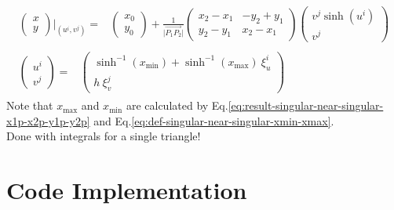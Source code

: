 \documentclass [10pt,letterpaper]{article}
\begin{document}
\begin{subequations} \label{eq:singular-near-singular-x-y-ui-vj}
	\begin{align} 
		\begin{split} 
			\begin{pmatrix} 
				x					\\
				y
			\end{pmatrix}
			\bigg\vert _{ (u^i,v^j) }
			=& 
			\begin{pmatrix}
				x_0					\\
				y_0
			\end{pmatrix}
			+
			\frac{1}{\lvert \overrightarrow{P_1 P_2} \rvert}
			\begin{pmatrix} 
				x_2-x_1 	& 	-y_2+y_1	\\
				y_2-y_1 	& 	x_2-x_1		
			\end{pmatrix}
			\begin{pmatrix}
				v^j \sinh(u^i)				\\
				v^j
			\end{pmatrix}
		\end{split}
		\\
		\begin{split} 
			\begin{pmatrix}
				u^i					\\
				v^j
			\end{pmatrix}
			=&
			\begin{pmatrix}
				\sinh^{-1}(x_{\min})
				+ 
				\sinh^{-1}(x_{\max})
				\ \xi_u^i				\\
				h
				\ \xi_v^j
			\end{pmatrix}
		\end{split}
	\end{align}
\end{subequations}
Note that $x_{\max}$ and $x_{\min}$ are calculated
by Eq.\eqref{eq:result-singular-near-singular-x1p-x2p-y1p-y2p}
and Eq.\eqref{eq:def-singular-near-singular-xmin-xmax}.
\\
Done with integrals for a single triangle!



\section{Code Implementation}
\label{sec:code-implementation}
\end{document}

